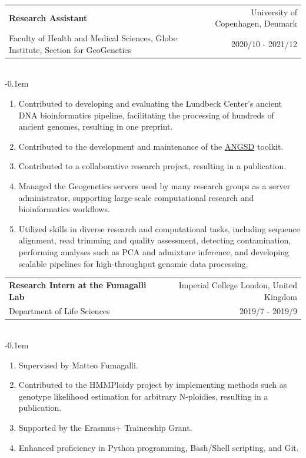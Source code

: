 \documentclass[letterpaper,10.5pt]{article}
\makeatletter
\newcommand{\cvSubheading}[5]{
  \vspace{-1pt}\item
    \begin{tabular*}{0.97\textwidth}{l@{\extracolsep{\fill}}r}
      \textbf{#1} & #2 \\
      {\small#3} & {\small #4} \\
    \end{tabular*}\vspace{3pt} \\
    #5
}
\makeatother
\begin{document}
        \cvSubheading
        {Research Assistant}
        {University of Copenhagen, Denmark}
        {Faculty of Health and Medical Sciences, Globe Institute, Section for GeoGenetics}
        {2020/10 - 2021/12}
          \vspace{-0.1em} \begin{enumerate}[label=\textbf{-},nosep,wide,  labelindent=0pt]
        \item Contributed to developing and evaluating the Lundbeck Center's ancient DNA bioinformatics pipeline, facilitating the processing of hundreds of ancient genomes, resulting in one preprint.
        \item Contributed to the development and maintenance of the \href{https://github.com/ANGSD/angsd/}{ANGSD} toolkit.
        \item Contributed to a collaborative research project, resulting in a publication.
        \item Managed the Geogenetics servers used by many research groups as a server administrator, supporting large-scale computational research and bioinformatics workflows.
        \item Utilized skills in diverse research and computational tasks, including sequence alignment, read trimming and quality assessment, detecting contamination, performing analyses such as PCA and admixture inference, and developing scalable pipelines for high-throughput genomic data processing.
    \end{enumerate}

    \medskip
    
    \cvSubheading
      {Research Intern at the Fumagalli Lab}
      {Imperial College London, United Kingdom}
      {Department of Life Sciences}
      {2019/7 - 2019/9}
          \vspace{-0.1em} \begin{enumerate}[label=\textbf{-},nosep,wide,  labelindent=0pt]
        \item Supervised by Matteo Fumagalli.
        \item Contributed to the HMMPloidy project by implementing methods such as genotype likelihood estimation for arbitrary N-ploidies, resulting in a publication.
        \item Supported by the Erasmus+ Traineeship Grant.
        \item Enhanced proficiency in Python programming, Bash/Shell scripting, and Git.
    \end{enumerate}
    \medskip
\end{document}
